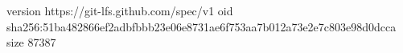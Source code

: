 version https://git-lfs.github.com/spec/v1
oid sha256:51ba482866ef2adbfbbb23e06e8731ae6f753aa7b012a73e2e7c803e98d0dcca
size 87387
